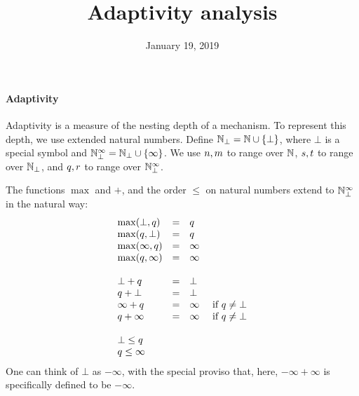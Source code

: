 \documentclass[a4paper,11pt]{article}
\title{Adaptivity analysis}
\author{}
\date{January 19, 2019}
\theoremstyle{definition}
\begin{document}
\maketitle

\paragraph{Adaptivity}
Adaptivity is a measure of the nesting depth of a mechanism. To
represent this depth, we use extended natural numbers. Define $\mathbb{N}_{\bot} =
\mathbb{N} \cup \{\bot\}$, where $\bot$ is a special symbol and $\mathbb{N}_{\bot}^\infty =
\mathbb{N}_{\bot} \cup \{\infty\}$. We use $n, m$ to range over $\mathbb{N}$,
$s, t$ to range over $\mathbb{N}_{\bot}$, and $q, r$ to
range over $\mathbb{N}_{\bot}^\infty$.

The functions $\max$ and $+$, and the order $\leq$ on natural numbers
extend to $\mathbb{N}_{\bot}^\infty$ in the natural way:
\[\begin{array}{lcl}
\max(\bot, \nnatbiA) & = & \nnatbiA \\
\max(\nnatbiA, \bot) & = & \nnatbiA \\
\max(\infty, \nnatbiA) & = & \infty \\
\max(\nnatbiA, \infty) & = & \infty \\
\\
%
\bot + \nnatbiA & = & \bot \\
\nnatbiA + \bot & = & \bot \\
\infty + \nnatbiA & = & \infty ~~~~ \mbox{if } \nnatbiA \neq \bot \\
\nnatbiA + \infty & = & \infty ~~~~ \mbox{if } \nnatbiA \neq \bot \\
\\
%
\bot \leq \nnatbiA \\
\nnatbiA \leq \infty
\end{array}
\]
One can think of $\bot$ as $-\infty$, with the special proviso that,
here, $-\infty + \infty$ is specifically defined to be $-\infty$.
\end{document}
